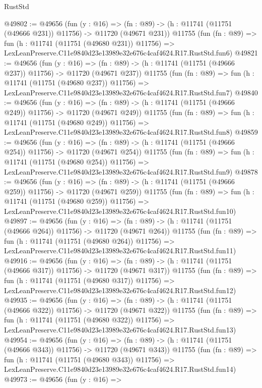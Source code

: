 \begin{lexlean}{RustStd}
\begin{coremodule}
@49802 := @49656
    (fun (y : @16) =>
    (fn : @89) -> (h : @11741 (@11751 (@49666 @231)) @11756) -> @11720 (@49671 @231))
    @11755
    (fun (fn : @89) =>
    fun (h : @11741 (@11751 (@49680 @231)) @11756) =>
    LexLeanPreserve.C11e9840d23e13989e32e676c4caf4624.R17.RustStd.fun6)
@49821 := @49656
    (fun (y : @16) =>
    (fn : @89) -> (h : @11741 (@11751 (@49666 @237)) @11756) -> @11720 (@49671 @237))
    @11755
    (fun (fn : @89) =>
    fun (h : @11741 (@11751 (@49680 @237)) @11756) =>
    LexLeanPreserve.C11e9840d23e13989e32e676c4caf4624.R17.RustStd.fun7)
@49840 := @49656
    (fun (y : @16) =>
    (fn : @89) -> (h : @11741 (@11751 (@49666 @249)) @11756) -> @11720 (@49671 @249))
    @11755
    (fun (fn : @89) =>
    fun (h : @11741 (@11751 (@49680 @249)) @11756) =>
    LexLeanPreserve.C11e9840d23e13989e32e676c4caf4624.R17.RustStd.fun8)
@49859 := @49656
    (fun (y : @16) =>
    (fn : @89) -> (h : @11741 (@11751 (@49666 @254)) @11756) -> @11720 (@49671 @254))
    @11755
    (fun (fn : @89) =>
    fun (h : @11741 (@11751 (@49680 @254)) @11756) =>
    LexLeanPreserve.C11e9840d23e13989e32e676c4caf4624.R17.RustStd.fun9)
@49878 := @49656
    (fun (y : @16) =>
    (fn : @89) -> (h : @11741 (@11751 (@49666 @259)) @11756) -> @11720 (@49671 @259))
    @11755
    (fun (fn : @89) =>
    fun (h : @11741 (@11751 (@49680 @259)) @11756) =>
    LexLeanPreserve.C11e9840d23e13989e32e676c4caf4624.R17.RustStd.fun10)
@49897 := @49656
    (fun (y : @16) =>
    (fn : @89) -> (h : @11741 (@11751 (@49666 @264)) @11756) -> @11720 (@49671 @264))
    @11755
    (fun (fn : @89) =>
    fun (h : @11741 (@11751 (@49680 @264)) @11756) =>
    LexLeanPreserve.C11e9840d23e13989e32e676c4caf4624.R17.RustStd.fun11)
@49916 := @49656
    (fun (y : @16) =>
    (fn : @89) -> (h : @11741 (@11751 (@49666 @317)) @11756) -> @11720 (@49671 @317))
    @11755
    (fun (fn : @89) =>
    fun (h : @11741 (@11751 (@49680 @317)) @11756) =>
    LexLeanPreserve.C11e9840d23e13989e32e676c4caf4624.R17.RustStd.fun12)
@49935 := @49656
    (fun (y : @16) =>
    (fn : @89) -> (h : @11741 (@11751 (@49666 @322)) @11756) -> @11720 (@49671 @322))
    @11755
    (fun (fn : @89) =>
    fun (h : @11741 (@11751 (@49680 @322)) @11756) =>
    LexLeanPreserve.C11e9840d23e13989e32e676c4caf4624.R17.RustStd.fun13)
@49954 := @49656
    (fun (y : @16) =>
    (fn : @89) -> (h : @11741 (@11751 (@49666 @343)) @11756) -> @11720 (@49671 @343))
    @11755
    (fun (fn : @89) =>
    fun (h : @11741 (@11751 (@49680 @343)) @11756) =>
    LexLeanPreserve.C11e9840d23e13989e32e676c4caf4624.R17.RustStd.fun14)
@49973 := @49656
    (fun (y : @16) =>

\end{coremodule}
\end{lexlean}
